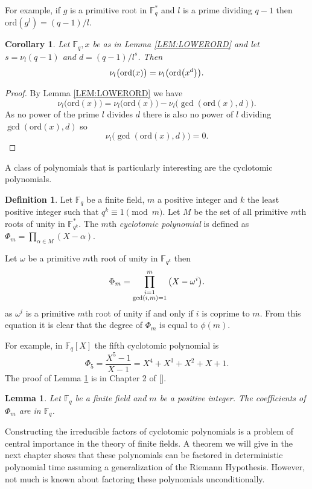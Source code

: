 \documentclass{article}
\let\originalleft\left
\let\originalright\right
\renewcommand{\left}{\mathopen{}\mathclose\bgroup\originalleft}
\renewcommand{\right}{\aftergroup\egroup\originalright}
\newcounter{dummy} \numberwithin{dummy}{section}
\theoremstyle{plain}
\newtheorem{cor}[dummy]{Corollary}
\newtheorem{lem}[dummy]{Lemma}
\theoremstyle{definition}
\newtheorem{mydef}[dummy]{Definition}
\def\Fq {{ \mathbb{F} _ {q} }}
\def\FQ {{ \mathbb{F}^* _ {q} }}
\def\FQE {{ \mathbb{F}^* _ {q^k} }}
\def\ord {{ \mathrm{ord} }}
\begin{document}
		For example, if $g$ is a primitive root in $\FQ$ and $l$ is a prime dividing $q-1$ then $\ord(g^l)=(q-1)/l$. 
		
		\begin{cor}
		\label{COR:ORDPOWER}
		    Let $\Fq,x$ be as in Lemma \ref{LEM:LOWERORD} and let $s=\nu_{l}(q-1)$ and $d=(q-1)/l^s$. Then 
				\[ \nu_l \bigl(\ord(x) \bigr)=\nu_l \left(\ord \left(x^d \right) \right). \]
		\end{cor}
		
		\begin{proof}
		    By Lemma \ref{LEM:LOWERORD} we have
		    \[ \nu_l \bigl(\ord(x) \bigr) = \nu_l \bigl(\ord(x) \bigr)-\nu_l \bigl(\gcd(\ord(x),d) \bigr). \]
				As no power of the prime $l$ divides $d$ there is also no power of $l$ dividing $\gcd(\ord(x),d)$ so 
				\[ \nu_l \bigl(\gcd(\ord(x),d) \bigr)=0. \]
		\end{proof}
				
		A class of polynomials that is particularly interesting are the cyclotomic polynomials. 
		
		\begin{mydef}
		\label{DEF:CYC}
		    Let $\Fq$ be a finite field, $m$ a positive integer and $k$ the least positive integer such that $q^k \equiv 1 \pmod m$. Let $M$ be the set of all primitive $m$th roots of unity in $\FQE$. The $m$th \emph{cyclotomic polynomial} is defined as $\Phi_m=\prod_{\alpha \in M}{(X-\alpha)}$. 
		\end{mydef}		
		Let $\omega$ be a primitive $m$th root of unity in $\mathbb{F}_{q^k}$ then
		    \[ \Phi_m=\prod_{\substack{i=1 \\ \gcd(i,m)=1}}^m{ \left(X-\omega^i \right)}. \]
		as $\omega^i$ is a primitive $m$th root of unity if and only if $i$ is coprime to $m$. From this equation it is clear that the degree of $\Phi_m$ is equal to $\phi(m)$. 
	
		For example, in $\Fq[X]$ the fifth cyclotomic polynomial is
		    \[\Phi_5=\frac{X^5-1}{X-1}=X^4+X^3+X^2+X+1.\]
		The proof of Lemma \ref{LEM:cycCos} is in Chapter 2 of []. 	
		\begin{lem}
		\label{LEM:cycCos}
		    Let $\Fq$ be a finite field and $m$ be a positive integer. The coefficients of $\Phi_m$ are in $\Fq$. 
		\end{lem}
		Constructing the irreducible factors of cyclotomic polynomials is a problem of central importance in the theory of finite fields. A theorem we will give in the next chapter shows that these polynomials can be factored in deterministic polynomial time assuming a generalization of the Riemann Hypothesis. However, not much is known about factoring these polynomials unconditionally.
		
\end{document}
